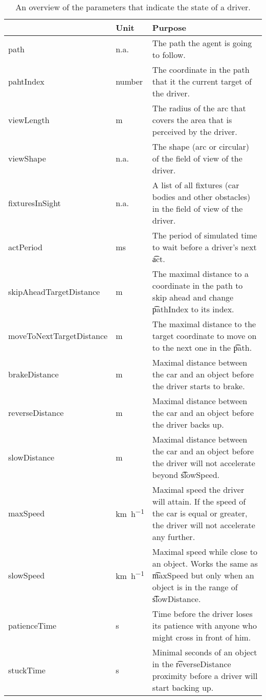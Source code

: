 \begin{table}
	\centering
	\begin{tabularx}{\textwidth}{>{\ttfamily}llX}
		\toprule
		\normalfont{Parameter}	&Unit & Purpose \\ 
		\midrule
		path					
			& n.a. 
			& The path the agent is going to follow. \\
		pahtIndex
			& number
			& The coordinate in the path that it the current target of the driver.\\
		viewLength 			
			& \si{\meter}
			& The radius of the arc that covers the area that is perceived by the driver.\\ 
		viewShape
			& n.a.
			& The shape (arc or circular) of the field of view of the driver.\\
		fixturesInSight
			& n.a.
			& A list of all fixtures (car bodies and other obstacles) in the field of view of the driver.\\ 
		actPeriod
			& \si{\milli\second}
			& The period of simulated time to wait before a driver's next \t{act}. \\
		skipAheadTargetDistance
			& \si{\meter}
			& The maximal distance to a coordinate in the path to skip ahead and change \t{pathIndex} to its index. \\
		moveToNextTargetDistance
			& \si{\meter}
			& The maximal distance to the target coordinate to move on to the next one in the \t{path}.\\
		brakeDistance
			& \si{\meter}
			& Maximal distance between the car and an object before the driver starts to brake. \\
		reverseDistance
			& \si{\meter}
			& Maximal distance between the car and an object before the driver backs up.\\
		slowDistance
			& \si{\meter}
			& Maximal distance between the car and an object before the driver will not accelerate beyond \t{slowSpeed}.\\
		maxSpeed
			& \si{\kilo\meter\per\hour}
			& Maximal speed the driver will attain. If the speed of the car is equal or greater, the driver will not accelerate any further.\\
		slowSpeed
			& \si{\kilo\meter\per\hour}
			& Maximal speed while close to an object. Works the same as \t{maxSpeed} but only when an object is in the range of \t{slowDistance}.\\
		patienceTime
			& \si{\second}
			& Time before the driver loses its patience with anyone who might cross in front of him.\\
		stuckTime
			& \si{\second}
			& Minimal seconds of an object in the \t{reverseDistance} proximity before a driver will start backing up.\\
		\bottomrule
	\end{tabularx}
	\caption{An overview of the parameters that indicate the state of a driver.}
	\label{tab:par:method:model:overview:state:lowlevel:driver}
\end{table}

